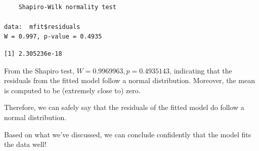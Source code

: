 \documentclass[
]{ctexart}
\newenvironment{Shaded}{\begin{snugshade}}{\end{snugshade}}
\newcommand{\FunctionTok}[1]{\textcolor[rgb]{0.13,0.29,0.53}{\textbf{#1}}}
\newcommand{\NormalTok}[1]{#1}
\newcommand{\SpecialCharTok}[1]{\textcolor[rgb]{0.81,0.36,0.00}{\textbf{#1}}}
\begin{document}
\begin{Shaded}
\end{Shaded}

\begin{verbatim}

    Shapiro-Wilk normality test

data:  mfit$residuals
W = 0.997, p-value = 0.4935
\end{verbatim}

\begin{Shaded}
\end{Shaded}

\begin{verbatim}
[1] 2.305236e-18
\end{verbatim}

From the Shapiro test, \(W = 0.9969963,p=0.4935143\), indicating that
the residuals from the fitted model follow a normal distribution.
Moreover, the mean is computed to be (extremely close to) zero.

Therefore, we can safely say that the residuals of the fitted model do
follow a normal distribution.

Based on what we've discussed, we can conclude confidently that the
model fits the data well!
\end{document}
